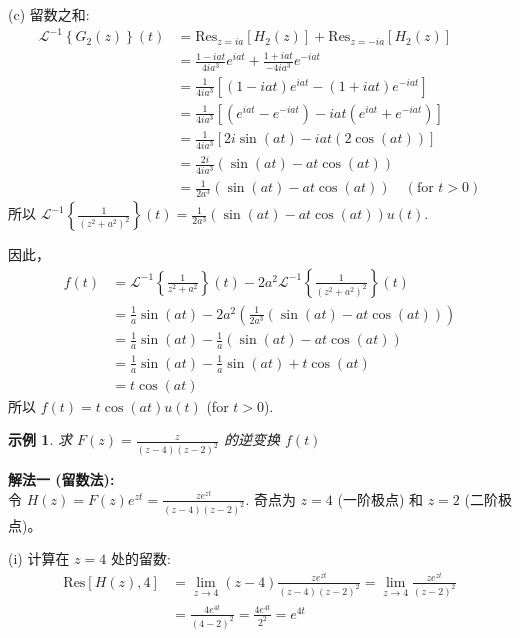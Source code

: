 \documentclass[linespread=1.5,openany]{book}%
\theoremstyle{plain}
\newtheorem{example}[theorem]{示例}
\begin{document}
{{{{{{{\begin{enumerate}
										(c) 留数之和:
										\begin{align*}
											\mathcal{L}^{-1}\left\{G_2(z)\right\}(t) &= \text{Res}_{z=ia} [H_2(z)] + \text{Res}_{z=-ia} [H_2(z)] \\[6pt]
											&= \frac{1-iat}{4ia^3}e^{iat} + \frac{1+iat}{-4ia^3}e^{-iat} \\[6pt]
											&= \frac{1}{4ia^3} \left[ (1-iat)e^{iat} - (1+iat)e^{-iat} \right] \\[6pt]
											&= \frac{1}{4ia^3} \left[ (e^{iat} - e^{-iat}) - iat(e^{iat} + e^{-iat}) \right] \\[6pt]
											&= \frac{1}{4ia^3} \left[ 2i\sin(at) - iat(2\cos(at)) \right] \\[6pt]
											&= \frac{2i}{4ia^3} (\sin(at) - at\cos(at)) \\[6pt]
											&= \frac{1}{2a^3}(\sin(at) - at\cos(at)) \quad (\text{for } t>0)
										\end{align*}
										所以 $\mathcal{L}^{-1}\left\{\frac{1}{(z^2+a^2)^2}\right\}(t) = \frac{1}{2a^3}(\sin(at) - at\cos(at))u(t)$.
									\end{enumerate}
									因此，
									\begin{align*}
										f(t) &= \mathcal{L}^{-1}\left\{\frac{1}{z^2+a^2}\right\}(t) - 2a^2 \mathcal{L}^{-1}\left\{\frac{1}{(z^2+a^2)^2}\right\}(t) \\[6pt]
										&= \frac{1}{a}\sin(at) - 2a^2 \left( \frac{1}{2a^3}(\sin(at) - at\cos(at)) \right) \\[6pt]
										&= \frac{1}{a}\sin(at) - \frac{1}{a}(\sin(at) - at\cos(at)) \\[6pt]
										&= \frac{1}{a}\sin(at) - \frac{1}{a}\sin(at) + t\cos(at) \\[6pt]
										&= t\cos(at)
									\end{align*}
									所以 $f(t) = t\cos(at)u(t)$ (for $t>0$).
									\vspace{\baselineskip}
									
									\begin{example}求 $F(z) = \frac{z}{(z-4)(z-2)^2}$ 的逆变换 $f(t)$ \label{ex:L16_inv_laplace_ex11_spaced}
									\end{example}
									\noindent\textbf{解法一 (留数法):} \\
									令 $H(z) = F(z)e^{zt} = \frac{z e^{zt}}{(z-4)(z-2)^2}$.
									奇点为 $z=4$ (一阶极点) 和 $z=2$ (二阶极点)。
									
									(i) 计算在 $z=4$ 处的留数:
									\begin{align*}
										\text{Res}[H(z), 4] &= \lim_{z\to 4} (z-4) \frac{z e^{zt}}{(z-4)(z-2)^2} = \lim_{z\to 4} \frac{z e^{zt}}{(z-2)^2} \\[6pt]
										&= \frac{4 e^{4t}}{(4-2)^2} = \frac{4e^{4t}}{2^2} = e^{4t}
									\end{align*}
									
}}}}}}}
\end{document}

